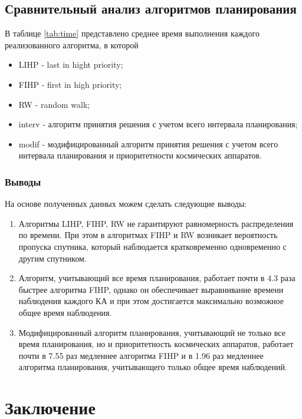 \section{Сравнительный анализ алгоритмов планирования}

В таблице \ref{tab:time} представлено среднее время выполнения каждого реализованного алгоритма, в которой 

\begin{itemize}
	\item LIHP - last in hight priority;
	\item FIHP - first in high priority;
	\item RW - random walk;
	\item interv - алгоритм принятия решения с учетом всего интервала планирования;
	\item modif - модифицированный алгоритм принятия решения с учетом всего интервала планирования и приоритетности космических аппаратов.
\end{itemize}

\captionsetup{singlelinecheck = false, justification=raggedleft}
\begin{table}[H]
	\centering
	\caption{Среднее время выполнения, с}
	\renewcommand{\arraystretch}{1.5}
\label{tab:time}
\end{table}

\subsection{Выводы}

На основе полученных данных можем сделать следующие выводы:

\begin{enumerate}
	\item Алгоритмы LIHP, FIHP, RW не гарантируют равномерность распределения по времени. При этом в алгоритмах FIHP и RW возникает вероятность пропуска спутника, который наблюдается кратковременно одновременно с другим спутником.
	\item Алгоритм, учитывающий все время планирования, работает почти в 4.3 раза быстрее алгоритма FIHP, однако он обеспечивает выравнивание времени наблюдения каждого КА и при этом достигается максимально возможное общее время наблюдения.
	\item Модифицированный алгоритм планирования, учитывающий не только все время планирования, но и приоритетность космических аппаратов, работает почти в 7.55 раз медленнее алгоритма FIHP и в 1.96 раз медленнее алгоритма планирования, учитывающего только общее время наблюдений.
\end{enumerate}

\chapter*{Заключение}

~~~ %
\printbibliography[heading=none]

